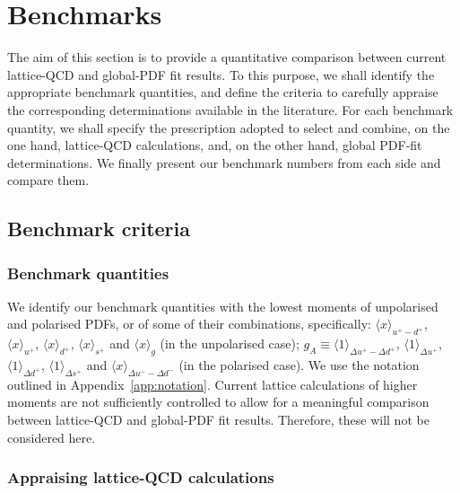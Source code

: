 \section{Benchmarks}
\label{sec:benchmarking}

The aim of this section is to provide a quantitative comparison between 
current lattice-QCD and global-PDF fit results.
%
To this purpose, we shall identify the appropriate benchmark quantities, 
and define the criteria to carefully appraise the corresponding determinations
available in the literature.
%
For each benchmark quantity, we shall specify the prescription adopted to 
select and combine, on the one hand, lattice-QCD calculations, and, on the 
other hand, global PDF-fit determinations.
%
We finally present our benchmark numbers from each side and compare them.

\subsection{Benchmark criteria}
\label{subsec:BC}

\subsubsection{Benchmark quantities}
\label{subsubsec:BQ}

We identify our benchmark quantities with the lowest moments of unpolarised 
and polarised PDFs, or of some of their combinations, specifically: 
$\langle x\rangle_{u^+-d^+}$, $\langle x \rangle_{u^+}$, $\langle x \rangle_{d^+}$, 
$\langle x \rangle_{s^+}$ and $\langle x \rangle_{g}$ (in the unpolarised case); 
$g_A\equiv\langle 1 \rangle_{\Delta u^+ - \Delta d ^+}$, 
$\langle 1 \rangle_{\Delta u^+}$, $\langle 1 \rangle_{\Delta d^+}$,  
$\langle 1 \rangle_{\Delta s^+}$ and $\langle x \rangle_{\Delta u^- - \Delta d^-}$ 
(in the polarised case).
%
We use the notation outlined in Appendix~\ref{app:notation}.
%
Current lattice calculations of higher moments are not sufficiently controlled
to allow for a meaningful comparison between lattice-QCD and global-PDF fit
results.
%
Therefore, these will not be considered here. 

\subsubsection{Appraising lattice-QCD calculations}
\label{subsubsec:BClQCD}

